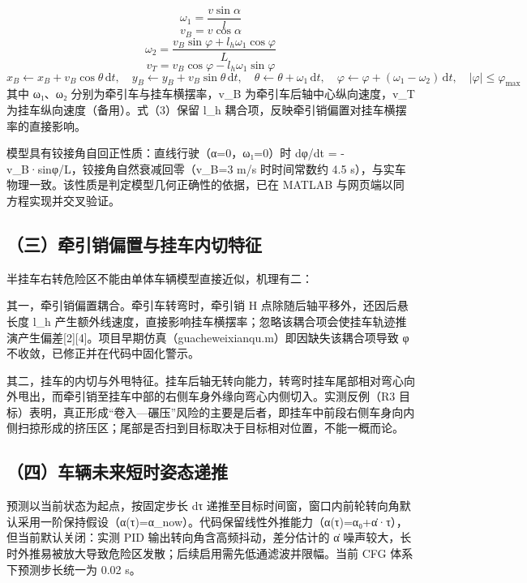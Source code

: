 \documentclass[UTF8,11pt]{ctexart}
\begin{document}
\begin{equation}
\omega_1 = \frac{v\sin\alpha}{l} 
\end{equation}
\begin{equation}
v_B = v\cos\alpha 
\end{equation}
\begin{equation}
\omega_2 = \frac{v_B\sin\varphi + l_h\omega_1\cos\varphi}{L} 
\end{equation}
\begin{equation}
v_T = v_B\cos\varphi - l_h\omega_1\sin\varphi 
\end{equation}
\begin{equation}
x_B \leftarrow x_B + v_B\cos\theta\,\mathrm{d}t,\quad y_B \leftarrow y_B + v_B\sin\theta\,\mathrm{d}t,\quad \theta \leftarrow \theta + \omega_1\,\mathrm{d}t,\quad \varphi \leftarrow \varphi + (\omega_1 - \omega_2)\,\mathrm{d}t,\quad |\varphi| \le \varphi_{\max} 
\end{equation}
其中 ω₁、ω₂ 分别为牵引车与挂车横摆率，v\_B 为牵引车后轴中心纵向速度，v\_T 为挂车纵向速度（备用）。式（3）保留 l\_h 耦合项，反映牵引销偏置对挂车横摆率的直接影响。

模型具有铰接角自回正性质：直线行驶（α=0，ω₁=0）时 dφ/dt = -v\_B·sinφ/L，铰接角自然衰减回零（v\_B=3 m/s 时时间常数约 4.5 s），与实车物理一致。该性质是判定模型几何正确性的依据，已在 MATLAB 与网页端以同方程实现并交叉验证。

\subsection*{（三）牵引销偏置与挂车内切特征}
半挂车右转危险区不能由单体车辆模型直接近似，机理有二：

其一，牵引销偏置耦合。牵引车转弯时，牵引销 H 点除随后轴平移外，还因后悬长度 l\_h 产生额外线速度，直接影响挂车横摆率；忽略该耦合项会使挂车轨迹推演产生偏差[2][4]。项目早期仿真（guacheweixianqu.m）即因缺失该耦合项导致 φ 不收敛，已修正并在代码中固化警示。

其二，挂车的内切与外甩特征。挂车后轴无转向能力，转弯时挂车尾部相对弯心向外甩出，而牵引销至挂车中部的右侧车身外缘向弯心内侧切入。实测反例（R3 目标）表明，真正形成“卷入—碾压”风险的主要是后者，即挂车中前段右侧车身向内侧扫掠形成的挤压区；尾部是否扫到目标取决于目标相对位置，不能一概而论。

\subsection*{（四）车辆未来短时姿态递推}
预测以当前状态为起点，按固定步长 dτ 递推至目标时间窗，窗口内前轮转向角默认采用一阶保持假设（α(τ)=α\_now）。代码保留线性外推能力（α(τ)=α₀+α̇·τ），但当前默认关闭：实测 PID 输出转向角含高频抖动，差分估计的 α̇ 噪声较大，长时外推易被放大导致危险区发散；后续启用需先低通滤波并限幅。当前 CFG 体系下预测步长统一为 0.02 s。
\end{document}
